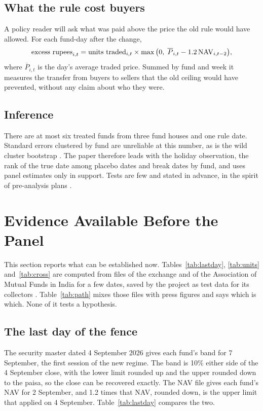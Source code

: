 \subsection{What the rule cost buyers}
A policy reader will ask what was paid above the price the old rule would have allowed. For each fund-day after the change,
\begin{equation}\label{eq:excess}
\text{excess rupees}_{i,t}=\text{units traded}_{i,t}\times\max\big(0,\;\overline{P}_{i,t}-1.2\,\mathrm{NAV}_{i,t-2}\big),
\end{equation}
where $\overline{P}_{i,t}$ is the day's average traded price. Summed by fund and week it measures the transfer from buyers to sellers that the old ceiling would have prevented, without any claim about who they were.

\subsection{Inference}
There are at most six treated funds from three fund houses and one rule date. Standard errors clustered by fund are unreliable at this number, as is the wild cluster bootstrap \citep{mackinnon2018wild}. The paper therefore leads with the holiday observation, the rank of the true date among placebo dates and break dates by fund, and uses panel estimates only in support. Tests are few and stated in advance, in the spirit of pre-analysis plans \citep{olken2015promises,harvey2017presidential}.

\section{Evidence Available Before the Panel}\label{sec:evidence}
This section reports what can be established now. Tables~\ref{tab:lastday}, \ref{tab:units} and~\ref{tab:cross} are computed from files of the exchange and of the Association of Mutual Funds in India for a few dates, saved by the project as test data for its collectors \citep{nse2026files,amfi2026nav}. Table~\ref{tab:path} mixes those files with press figures and says which is which. None of it tests a hypothesis.

\subsection{The last day of the fence}
The security master dated 4 September 2026 gives each fund's band for 7 September, the first session of the new regime. The band is 10\% either side of the 4 September close, with the lower limit rounded up and the upper rounded down to the paisa, so the close can be recovered exactly. The NAV file gives each fund's NAV for 2 September, and 1.2 times that NAV, rounded down, is the upper limit that applied on 4 September. Table~\ref{tab:lastday} compares the two.


